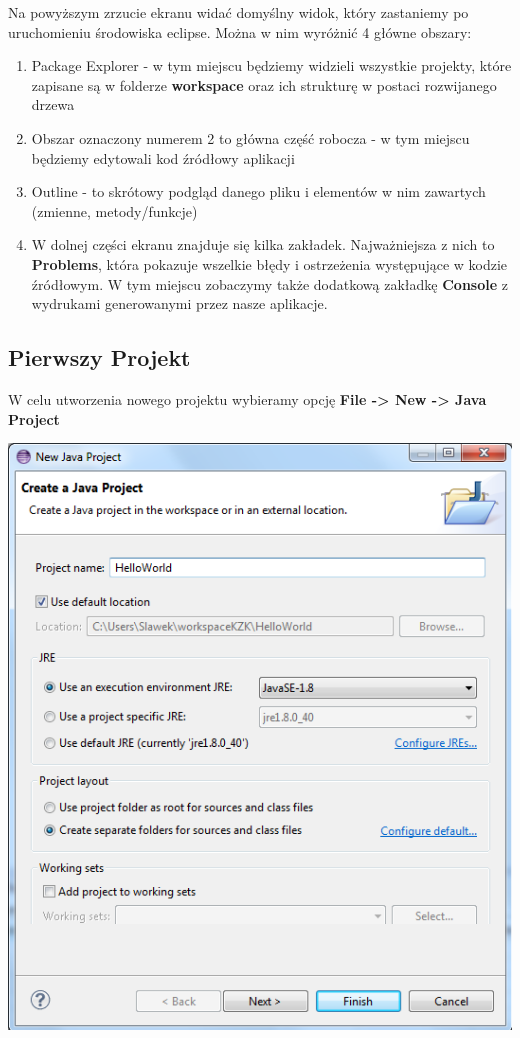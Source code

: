 \documentclass[letterpaper,10pt,english]{sphinxmanual}
\begin{document}
Na powyższym zrzucie ekranu widać domyślny widok, który zastaniemy po uruchomieniu środowiska eclipse. Można w nim wyróżnić 4 główne obszary:
\begin{enumerate}
\item {} 
Package Explorer - w tym miejscu będziemy widzieli wszystkie projekty, które zapisane są w folderze \textbf{workspace} oraz ich strukturę w postaci rozwijanego drzewa

\item {} 
Obszar oznaczony numerem 2 to główna część robocza - w tym miejscu będziemy edytowali kod źródłowy aplikacji

\item {} 
Outline - to skrótowy podgląd danego pliku i elementów w nim zawartych (zmienne, metody/funkcje)

\item {} 
W dolnej części ekranu znajduje się kilka zakładek. Najważniejsza z nich to \textbf{Problems}, która pokazuje wszelkie błędy i ostrzeżenia występujące w kodzie źródłowym. W tym miejscu zobaczymy także dodatkową zakładkę \textbf{Console} z wydrukami generowanymi przez nasze aplikacje.

\end{enumerate}


\subsection{Pierwszy Projekt}
\label{wprowadzenie:pierwszy-projekt}
W celu utworzenia nowego projektu wybieramy opcję \textbf{File -\textgreater{} New -\textgreater{} Java Project}

{\hfill\includegraphics{eclipse_first_project.png}\hfill}
\end{document}
